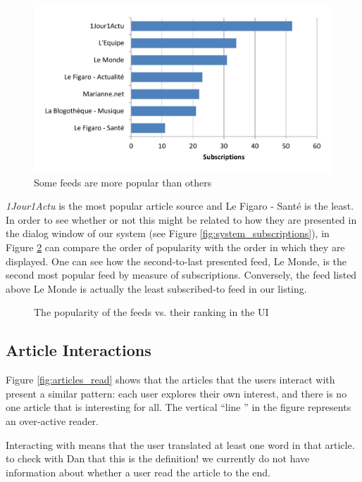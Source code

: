 \begin{figure}[h!]
\centering
  \includegraphics[width=0.6\columnwidth]{figures/feed_popularity}
  \caption{Some feeds are more popular than others}
  \label{fig:feedpopularity}
\end{figure}


{\em 1Jour1Actu} is the most popular article source and Le Figaro - Sant\'e is the least. In order to see whether or not this might be related to how they are presented in the dialog window of our system (see Figure \ref{fig:system_subscriptions}), in Figure \ref{fig:popularityvsranking} can compare the order of popularity with the order in which they are displayed. One can see how the second-to-last presented feed, Le Monde, is the second most popular feed by measure of subscriptions. Conversely, the feed listed above Le Monde is actually the least subscribed-to feed in our listing.


\begin{figure}[h!]
\centering
  
  \caption{The popularity of the feeds vs. their ranking in the UI}
  \label{fig:popularityvsranking}
\end{figure}




\subsection{Article Interactions}
Figure \ref{fig:articles_read} shows that the articles that the users interact with present a similar pattern: each user explores their own interest, and there is no one article that is interesting for all. The vertical ``line '' in the figure represents an over-active reader.


  Interacting with means that the user translated at least one word in that article. to check with Dan that this is the definition! we currently do not have information about whether a user read the article to the end. 

